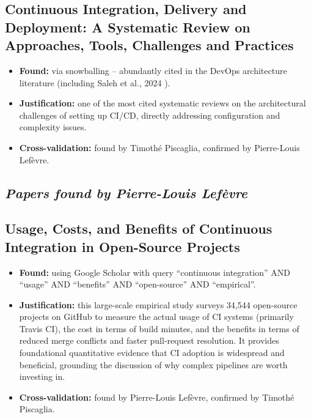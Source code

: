 \documentclass[a4paper,11pt,oneside]{article}
\begin{document}
\subsection{Continuous Integration, Delivery and Deployment: A Systematic Review on Approaches, Tools, Challenges and Practices \cite{Shahin2017}}
%
\begin{itemize}
    \item \textbf{Found:} via snowballing -- abundantly cited in the DevOps architecture literature (including Saleh et al., 2024 \cite{Saleh2024}).
    \item \textbf{Justification:} one of the most cited systematic reviews on the architectural challenges of setting up CI/CD, directly addressing configuration and complexity issues.
    \item \textbf{Cross-validation:} found by Timoth\'{e} Piscaglia, confirmed by Pierre-Louis Lef\`{e}vre.
\end{itemize}

\subsection*{\textit{Papers found by Pierre-Louis Lef\`{e}vre}}

\subsection{Usage, Costs, and Benefits of Continuous Integration in Open-Source Projects \cite{Hilton2016}}
%
\begin{itemize}
    \item \textbf{Found:} using Google Scholar with query ``continuous integration'' AND ``usage'' AND ``benefits'' AND ``open-source'' AND ``empirical''.
    \item \textbf{Justification:} this large-scale empirical study surveys 34,544 open-source projects on GitHub to measure the actual usage of CI systems (primarily Travis CI), the cost in terms of build minutes, and the benefits in terms of reduced merge conflicts and faster pull-request resolution. It provides foundational quantitative evidence that CI adoption is widespread and beneficial, grounding the discussion of why complex pipelines are worth investing in.
    \item \textbf{Cross-validation:} found by Pierre-Louis Lef\`{e}vre, confirmed by Timoth\'{e} Piscaglia.
\end{itemize}
\end{document}
